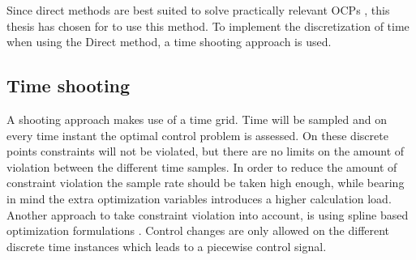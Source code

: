 Since direct methods are best suited to solve practically relevant OCPs \cite{Mercy2018}, this thesis has chosen for to use this method. To implement the discretization of time when using the Direct method, a time shooting approach is used.

\subsection{Time shooting}
A shooting approach makes use of a time grid. Time will be sampled and on every time instant the optimal control problem is assessed. On these discrete points constraints will not be violated, but there are no limits on the amount of violation between the different time samples. In order to reduce the amount of constraint violation the sample rate should be taken high enough, while bearing in mind the extra optimization variables introduces a higher calculation load. Another approach to take constraint violation into account, is using spline based optimization formulations \cite{Mercy2018}. Control changes are only allowed on the different discrete time instances which leads to a piecewise control signal.\\


